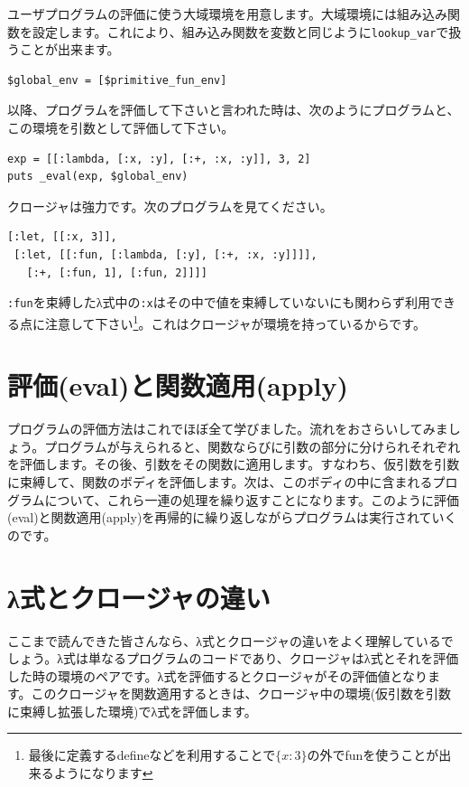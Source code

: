 ユーザプログラムの評価に使う大域環境を用意します。大域環境には組み込み関数を設定します。これにより、組み込み関数を変数と同じように{\tt lookup\_var}で扱うことが出来ます。

\begin{lstlisting}
$global_env = [$primitive_fun_env]
\end{lstlisting}

以降、プログラムを評価して下さいと言われた時は、次のようにプログラムと、
この環境を引数として評価して下さい。

\begin{lstlisting}
exp = [[:lambda, [:x, :y], [:+, :x, :y]], 3, 2]
puts _eval(exp, $global_env)
\end{lstlisting}

クロージャは強力です。次のプログラムを見てください。

\begin{lstlisting}
[:let, [[:x, 3]],
 [:let, [[:fun, [:lambda, [:y], [:+, :x, :y]]]],
   [:+, [:fun, 1], [:fun, 2]]]]
\end{lstlisting}

{\tt :fun}を束縛したλ式中の{\tt :x}はその中で値を束縛していないにも関わらず利用できる点に注意して下さい\footnote{最後に定義するdefineなどを利用することで$\{x:3\}$の外でfunを使うことが出来るようになります}。これはクロージャが環境を持っているからです。

\section{評価(eval)と関数適用(apply)}

プログラムの評価方法はこれでほぼ全て学びました。流れをおさらいしてみましょう。プログラムが与えられると、関数ならびに引数の部分に分けられそれぞれを評価します。その後、引数をその関数に適用します。すなわち、仮引数を引数に束縛して、関数のボディを評価します。次は、このボディの中に含まれるプログラムについて、これら一連の処理を繰り返すことになります。このように評価(eval)と関数適用(apply)を再帰的に繰り返しながらプログラムは実行されていくのです。


\section{λ式とクロージャの違い}

ここまで読んできた皆さんなら、λ式とクロージャの違いをよく理解しているでしょう。λ式は単なるプログラムのコードであり、クロージャはλ式とそれを評価した時の環境のペアです。λ式を評価するとクロージャがその評価値となります。このクロージャを関数適用するときは、クロージャ中の環境(仮引数を引数に束縛し拡張した環境)でλ式を評価します。

